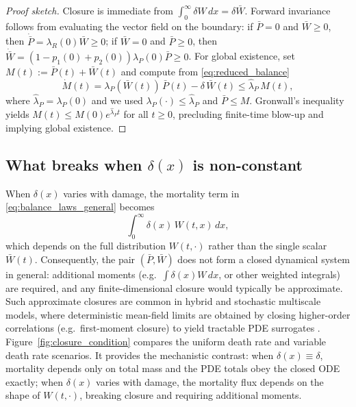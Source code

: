 \documentclass[pdflatex,sn-mathphys-ay]{sn-jnl}
\theoremstyle{thmstyleone}
\theoremstyle{definition}
\theoremstyle{remark}
\begin{document}
\begin{proof}[Proof sketch]
Closure is immediate from $\int_0^\infty \delta W\,dx=\delta\bar W$.
Forward invariance follows from evaluating the vector field on the boundary:
if $\bar P=0$ and $\bar W\ge 0$, then $\dot{\bar P}=\lambda_R(0)\bar W\ge 0$;
if $\bar W=0$ and $\bar P\ge 0$, then $\dot{\bar W}=(1-p_1(0)+p_2(0))\lambda_P(0)\bar P\ge 0$.
For global existence, set $M(t):=\bar P(t)+\bar W(t)$ and compute from \eqref{eq:reduced_balance}
\begin{equation}\label{eq:M_balance}
\dot M(t)=\lambda_P(\bar W(t))\,\bar P(t)-\delta\,\bar W(t)
\le \hat\lambda_P\,M(t),
\end{equation}
where $\hat\lambda_P=\lambda_P(0)$ and we used $\lambda_P(\cdot)\le\hat\lambda_P$ and $\bar P\le M$.
Gronwall's inequality yields $M(t)\le M(0)e^{\hat\lambda_P t}$ for all $t\ge 0$,
precluding finite-time blow-up and implying global existence.
\end{proof}

\subsection{What breaks when \texorpdfstring{$\delta(x)$}{delta(x)} is non-constant}
\label{subsec:nonconstant_delta_breaks}
When $\delta(x)$ varies with damage, the mortality term in \eqref{eq:balance_laws_general} becomes
\[
\int_0^\infty \delta(x)\,W(t,x)\,dx,
\]
which depends on the full distribution $W(t,\cdot)$ rather than the single scalar $\bar W(t)$.
Consequently, the pair $(\bar P,\bar W)$ does not form a closed dynamical system in general:
additional moments (e.g.\ $\int \delta(x)W\,dx$, or other weighted integrals) are required, and
any finite-dimensional closure would typically be approximate. 
Such approximate closures are common in hybrid and stochastic multiscale models, where deterministic mean-field limits are obtained by closing higher-order correlations (e.g.\ first-moment closure) to yield tractable PDE surrogates \citep{wang_analysis_2025}.
Figure~\ref{fig:closure_condition} compares the uniform death rate and variable death rate scenarios. It provides the mechanistic contrast: when $\delta(x)\equiv\delta$, mortality depends only on total mass and the PDE totals obey the closed ODE exactly; when $\delta(x)$ varies with damage, the mortality flux depends on the shape of $W(t,\cdot)$, breaking closure and requiring additional moments.
\end{document}
